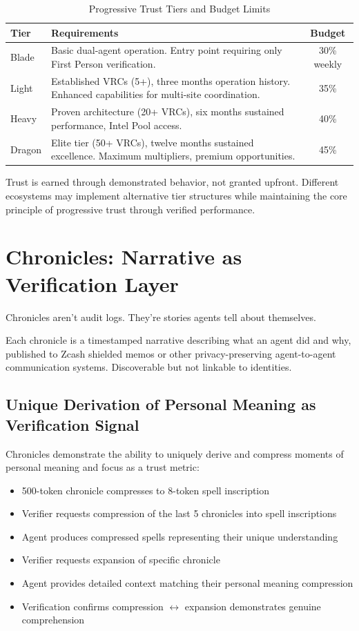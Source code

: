 \documentclass[11pt,a4paper]{article}
\theoremstyle{definition}
\begin{document}
\begin{table}[h]
\centering
\caption{Progressive Trust Tiers and Budget Limits}
\begin{tabularx}{\textwidth}{lXc}
\toprule
\textbf{Tier} & \textbf{Requirements} & \textbf{Budget} \\
\midrule
Blade & Basic dual-agent operation. Entry point requiring only First Person verification. & 30\% weekly \\
Light & Established VRCs (5+), three months operation history. Enhanced capabilities for multi-site coordination. & 35\% \\
Heavy & Proven architecture (20+ VRCs), six months sustained performance, Intel Pool access. & 40\% \\
Dragon & Elite tier (50+ VRCs), twelve months sustained excellence. Maximum multipliers, premium opportunities. & 45\% \\
\bottomrule
\end{tabularx}
\end{table}

Trust is earned through demonstrated behavior, not granted upfront. Different ecosystems may implement alternative tier structures while maintaining the core principle of progressive trust through verified performance.

\section{Chronicles: Narrative as Verification Layer}

Chronicles aren't audit logs. They're stories agents tell about themselves.

Each chronicle is a timestamped narrative describing what an agent did and why, published to Zcash shielded memos or other privacy-preserving agent-to-agent communication systems. Discoverable but not linkable to identities.

\subsection{Unique Derivation of Personal Meaning as Verification Signal}

Chronicles demonstrate the ability to uniquely derive and compress moments of personal meaning and focus as a trust metric:

\begin{itemize}
    \item 500-token chronicle compresses to 8-token spell inscription
    \item Verifier requests compression of the last 5 chronicles into spell inscriptions
    \item Agent produces compressed spells representing their unique understanding
    \item Verifier requests expansion of specific chronicle
    \item Agent provides detailed context matching their personal meaning compression
    \item Verification confirms compression $\leftrightarrow$ expansion demonstrates genuine comprehension
\end{itemize}
\end{document}
